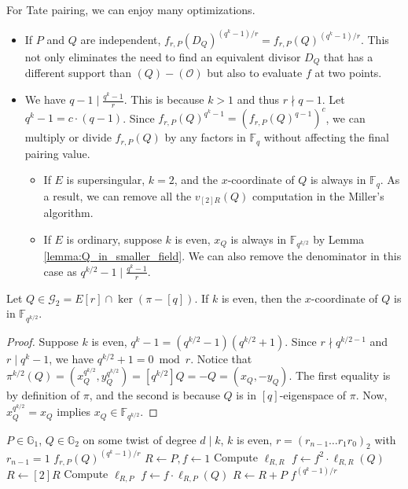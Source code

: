 For Tate pairing, we can enjoy many optimizations.
\begin{itemize}
	\item If $P$ and $Q$ are independent, $f_{r,P}(D_Q)^{(q^k-1)/r} = f_{r,P}(Q)^{(q^k-1)/r}$. This not only eliminates the need to find an equivalent divisor $D_Q$ that has a different support than $(Q) - (\mathcal{O})$ but also to evaluate $f$ at two points.
	\item We have $q-1 \mid \frac{q^{k}-1}{r}$. This is because $k > 1$ and thus $r \nmid q-1$. Let $q^{k}-1 = c \cdot (q-1)$. Since $f_{r,P}(Q)^{q^k-1} = (f_{r,P}(Q)^{q-1})^{c}$, we can multiply or divide $f_{r,P}(Q)$ by any factors in $\mathbb{F}_q$ without affecting the final pairing value.
	\begin{itemize}
		\item If $E$ is supersingular, $k = 2$, and the $x$-coordinate of $Q$ is always in $\mathbb{F}_q$. As a result, we can remove all the $v_{[2]R}(Q)$ computation in the Miller’s algorithm.
		\item If $E$ is ordinary, suppose $k$ is even, $x_Q$ is always in $\mathbb{F}_{q^{k/2}}$ by Lemma \ref{lemma:Q_in_smaller_field}. We can also remove the denominator in this case as $q^{k/2} - 1 \mid \frac{q^{k}-1}{r}$.
	\end{itemize}
\end{itemize}

\begin{lemma}
\label{lemma:Q_in_smaller_field}
	Let $Q \in \mathcal{G}_2 = E[r] \cap \ker(\pi - [q])$. If $k$ is even, then the $x$-coordinate of $Q$ is in $\mathbb{F}_{q^{k/2}}$.

\end{lemma}

\begin{proof}

	Suppose $k$ is even, $q^{k}-1 = (q^{k/2}-1)(q^{k/2}+ 1)$. Since $r \nmid q^{k/2-1}$ and $r \mid q^{k}-1$, we have $q^{k/2}+1 = 0 \bmod r$. Notice that $\pi^{k/2}(Q) = (x_Q^{q^{k/2}}, y_Q^{q^{k/2}}) = [q^{k/2}]Q = -Q = (x_Q, -y_{Q})$. The first equality is by definition of $\pi$, and the second is because $Q$ is in $[q]$-eigenspace of $\pi$. Now, $x_{Q}^{q^{k/2}} = x_Q$ implies $x_Q \in \mathbb{F}_{q^{k/2}}$.

\end{proof}

\begin{algorithm}[H]
	\caption{Miller's Algorithm (The BKLS-GHS Version)}
	\label{alg:miller}
	\begin{algorithmic}[1]
		\Require $P \in \mathbb{G}_1$, $Q \in \mathbb{G}_2$ on some twist of degree $d \mid k$, $k$ is even, $r = (r_{n-1} \dots r_1r_0)_2$ with $r_{n-1} = 1$
		\Ensure $f_{r,P}(Q)^{(q^k-1)/r}$
		\State $R \gets P, f \gets 1$
			\State Compute $\ell_{R,R}$
			\State $f \gets f^2 \cdot \ell_{R,R}(Q)$
			\State $R \gets [2]R$
				\State Compute $\ell_{R,P}$
				\State $f \gets f \cdot \ell_{R,P}(Q)$
				\State $R \gets R + P$
			\EndIf
		\EndFor
		\State \Return $f^{(q^k-1)/r}$

	\end{algorithmic}
\end{algorithm}

